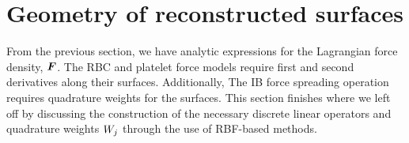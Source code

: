 



\section{Geometry of reconstructed surfaces}\label{sec:rbfs}

From the previous section, we have analytic expressions for the Lagrangian force density,
$\boldsymbol{F}$. The RBC and platelet force models require first and second derivatives along their
surfaces. Additionally, The IB force spreading operation requires quadrature weights for
the surfaces. This section finishes where we left off by discussing the construction of
the necessary discrete linear operators and quadrature weights $\weight[j]$ through the
use of RBF-based methods.




